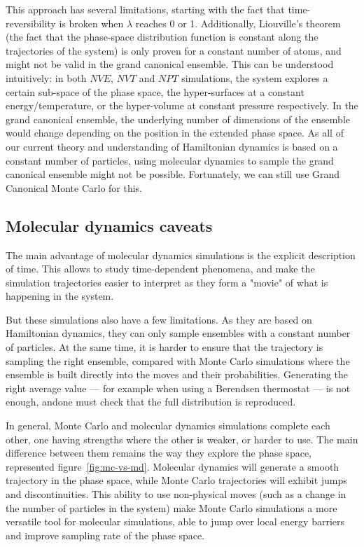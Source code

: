 \documentclass[thesis]{subfiles}
\begin{document}
This approach has several limitations, starting with the fact that
time-reversibility is broken when $\lambda$ reaches 0 or 1. Additionally,
Liouville's theorem (the fact that the phase-space distribution function is
constant along the trajectories of the system) is only proven for a constant
number of atoms, and might not be valid in the grand canonical
ensemble\cite{DelleSite2016}. This can be understood intuitively: in both $NVE$,
$NVT$ and $NPT$ simulations, the system explores a certain sub-space of the
phase space, the hyper-surfaces at a constant energy/temperature, or the
hyper-volume at constant pressure respectively. In the grand canonical ensemble,
the underlying number of dimensions of the ensemble would change depending on the
position in the extended phase space. As all of our current theory and
understanding of Hamiltonian dynamics is based on a constant number of
particles, using molecular dynamics to sample the grand canonical ensemble might
not be possible. Fortunately, we can still use Grand Canonical Monte Carlo for
this.

\subsection{Molecular dynamics caveats}

The main advantage of molecular dynamics simulations is the explicit description
of time. This allows to study time-dependent phenomena, and make the simulation
trajectories easier to interpret as they form a "movie" of what is happening in
the system.

But these simulations also have a few limitations. As they are based on
Hamiltonian dynamics, they can only sample ensembles with a constant number of
particles.  At the same time, it is harder to ensure that the trajectory is
sampling the right ensemble, compared with Monte Carlo simulations where the
ensemble is built directly into the moves and their probabilities. Generating
the right average value --- for example when using a Berendsen thermostat --- is
not enough, andone must check that the full distribution is reproduced.

In general, Monte Carlo and molecular dynamics simulations complete each other,
one having strengths where the other is weaker, or harder to use. The main
difference between them remains the way they explore the phase space,
represented figure~\ref{fig:mc-vs-md}. Molecular dynamics will generate a smooth
trajectory in the phase space, while Monte Carlo trajectories will exhibit jumps
and discontinuities. This ability to use non-physical moves (such as a change
in the number of particles in the system) make Monte Carlo simulations a more
versatile tool for molecular simulations, able to jump over local energy
barriers and improve sampling rate of the phase space.
\end{document}
